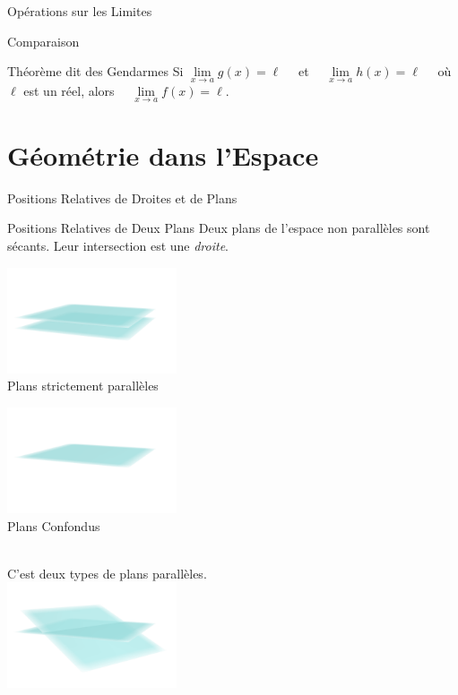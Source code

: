 \documentclass{coursbook}
\begin{document}
\begin{Gpartie}{Opérations sur les Limites}
\begin{Spartie}{Comparaison}
\begin{SSpartie}{Théorème dit \og des Gendarmes \fg{}}
                Si $\lim\limits_{x\to a}g(x)=\ell\quad$ et $\quad\lim\limits_{x\to a}h(x)=\ell\quad$ où $\ell$ est un réel, alors $\quad\lim\limits_{x\to a}f(x)=\ell$.
            \end{SSpartie}
        \end{Spartie}
    \end{Gpartie}







    \chapter{Géométrie dans l'Espace}

    \begin{Gpartie}{Positions Relatives de Droites et de Plans} 
        \begin{Spartie}{Positions Relatives de Deux Plans} 
            Deux plans de l'espace non parallèles sont sécants. Leur intersection est une \emph{droite}.
            \begin{center}
                    \begin{minipage}{5cm}\includegraphics[width=5cm]{rsc/11fig1a.png}\\ \centering Plans strictement parallèles\end{minipage}
                    \begin{minipage}{5cm}\includegraphics[width=5cm]{rsc/11fig1b.png}\\ \centering Plans Confondus\phantom{p}\end{minipage} \\[2ex] %
                    C'est deux types de plans parallèles. \\
                    \includegraphics[width=5cm]{rsc/11fig1c.png} \\

\end{center}
\end{Spartie}
\end{Gpartie}
\end{document}
